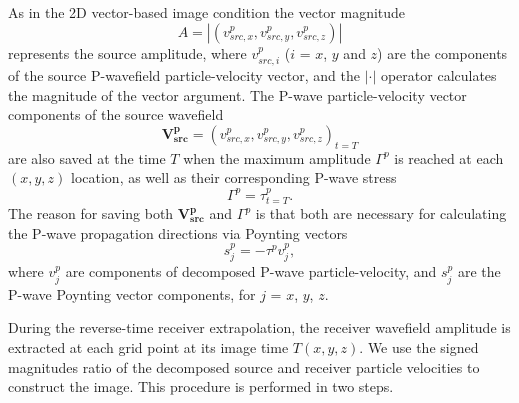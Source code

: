 \documentclass[manuscript,ulem,graphix,revised]{geophysics}
\begin{document}
As in the 2D vector-based image condition \citep{wenlong_vct15} the vector magnitude
\begin{equation}
A=|(v^p_{src,x}, v^p_{src,y},v^p_{src,z})|
\label{eqn:amap}
\end{equation}
represents the source amplitude, where $v^p_{src,i}$ ($i$ = $x$, $y$ and $z$) are the components of the source P-wavefield particle-velocity vector, and the $|\cdot|$ operator calculates the magnitude of the vector argument. The P-wave particle-velocity vector components of the source wavefield
\begin{equation}
\mathbf{V^p_{src}}=(v^p_{src,x}, v^p_{src,y},v^p_{src,z})_{t=T}
\label{eqn:vctmap1}
\end{equation}
are also saved at the time $T$ when the maximum amplitude $\Gamma^p$ is reached at each $(x,y,z)$ location, as well as their corresponding P-wave stress
\begin{equation}
\Gamma^p=\tau^p_{t=T}.
\label{eqn:vctmap2}
\end{equation}
The reason for saving both $\mathbf{V^p_{src}}$ and $\Gamma^p$ is that both are necessary for calculating the P-wave propagation directions via Poynting vectors \citep{cerveny01}
\begin{equation}
s^{p}_j=-\tau^p v^p_j,
\label{eqn:poynting_p}
\end{equation}
where $v^p_j$ are components of decomposed P-wave particle-velocity, and $s^{p}_j$ are the P-wave Poynting vector components, for $j$ = $x$, $y$, $z$.



During the reverse-time receiver extrapolation, the receiver wavefield amplitude is extracted at each grid point at its image time $T(x,y,z)$. We use the signed magnitudes ratio of the decomposed source and receiver particle velocities to construct the image. This procedure is performed in two steps.
\end{document}
